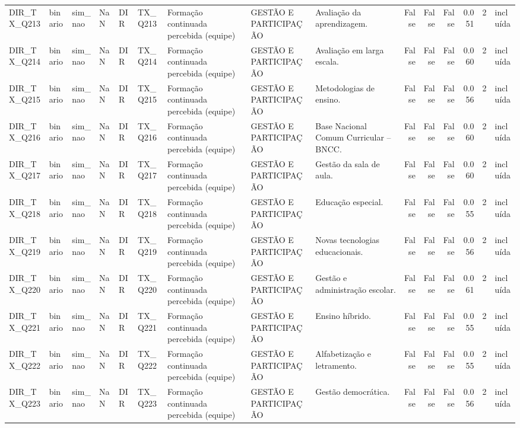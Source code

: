 \begin{tabular}{lllllllllrrrrrl}
DIR\_TX\_Q213 & binario & sim\_nao & NaN & DIR & TX\_Q213 & Formação continuada percebida (equipe) & GESTÃO E PARTICIPAÇÃO & Avaliação da aprendizagem. & False & False & False & 0.051 & 2 & incluída \\
DIR\_TX\_Q214 & binario & sim\_nao & NaN & DIR & TX\_Q214 & Formação continuada percebida (equipe) & GESTÃO E PARTICIPAÇÃO & Avaliação em larga escala. & False & False & False & 0.060 & 2 & incluída \\
DIR\_TX\_Q215 & binario & sim\_nao & NaN & DIR & TX\_Q215 & Formação continuada percebida (equipe) & GESTÃO E PARTICIPAÇÃO & Metodologias de ensino. & False & False & False & 0.056 & 2 & incluída \\
DIR\_TX\_Q216 & binario & sim\_nao & NaN & DIR & TX\_Q216 & Formação continuada percebida (equipe) & GESTÃO E PARTICIPAÇÃO & Base Nacional Comum Curricular – BNCC. & False & False & False & 0.060 & 2 & incluída \\
DIR\_TX\_Q217 & binario & sim\_nao & NaN & DIR & TX\_Q217 & Formação continuada percebida (equipe) & GESTÃO E PARTICIPAÇÃO & Gestão da sala de aula. & False & False & False & 0.060 & 2 & incluída \\
DIR\_TX\_Q218 & binario & sim\_nao & NaN & DIR & TX\_Q218 & Formação continuada percebida (equipe) & GESTÃO E PARTICIPAÇÃO & Educação especial. & False & False & False & 0.055 & 2 & incluída \\
DIR\_TX\_Q219 & binario & sim\_nao & NaN & DIR & TX\_Q219 & Formação continuada percebida (equipe) & GESTÃO E PARTICIPAÇÃO & Novas tecnologias educacionais. & False & False & False & 0.056 & 2 & incluída \\
DIR\_TX\_Q220 & binario & sim\_nao & NaN & DIR & TX\_Q220 & Formação continuada percebida (equipe) & GESTÃO E PARTICIPAÇÃO & Gestão e administração escolar. & False & False & False & 0.061 & 2 & incluída \\
DIR\_TX\_Q221 & binario & sim\_nao & NaN & DIR & TX\_Q221 & Formação continuada percebida (equipe) & GESTÃO E PARTICIPAÇÃO & Ensino híbrido. & False & False & False & 0.055 & 2 & incluída \\
DIR\_TX\_Q222 & binario & sim\_nao & NaN & DIR & TX\_Q222 & Formação continuada percebida (equipe) & GESTÃO E PARTICIPAÇÃO & Alfabetização e letramento. & False & False & False & 0.055 & 2 & incluída \\
DIR\_TX\_Q223 & binario & sim\_nao & NaN & DIR & TX\_Q223 & Formação continuada percebida (equipe) & GESTÃO E PARTICIPAÇÃO & Gestão democrática. & False & False & False & 0.056 & 2 & incluída \\

\end{tabular}
